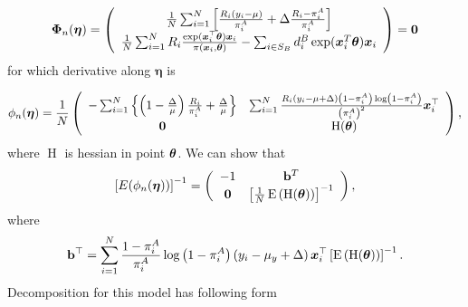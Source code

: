 \documentclass[
  letterpaper,
  DIV=11,
  numbers=noendperiod]{scrreprt}
\begin{document}
\[
\begin{equation*}
\boldsymbol{\Phi}_n(\boldsymbol{\eta})=\left(\begin{array}{c}
\frac{1}{N} \sum_{i=1}^N\left[\frac{R_i\left(y_i-\mu\right)}{\pi_i^A}+\Delta \frac{R_i-\pi_i^A}{\pi_i^A}\right] \\
\frac{1}{N}\sum_{i=1}^N R_i \frac{\exp(\bx_{i}^{\top}\btheta)\bx_{i}}{\pi(\bx_{i}, \btheta)} - \sum_{i \in S_{B}}d_{i}^{B}\exp(\bx_{i}^{T}\btheta)\bx_{i}
\end{array}\right) = \bZero
\end{equation*}
\] for which derivative along \(\boldsymbol{\eta}\) is

\[
\begin{equation*}
\phi_n(\boldsymbol{\eta})=\frac{1}{N}\left(\begin{array}{cc}
-\sum_{i=1}^N\left\{\left(1-\frac{\Delta}{\mu}\right) \frac{R_i}{\pi_i^A}+\frac{\Delta}{\mu}\right\} & \sum_{i=1}^N \frac{R_i\left(y_i-\mu + \Delta\right)\left(1 - \pi_i^A\right)\log \left(1 - \pi_i^A\right)}{\left(\pi_i^A\right)^2} \boldsymbol{x}_i^{\top} \\
\mathbf{0} & \operatorname{H}(\btheta)
\end{array}\right),
\end{equation*}
\] where \(\operatorname{H}\) is hessian in point \(\boldsymbol{\theta}\). We can
show that \[
\begin{equation*}
\left[E(\phi_n(\boldsymbol{\eta}))\right]^{-1}=\left(\begin{array}{cc}
-1 & \mathbf{b}^T \\
\mathbf{0} & \left[\frac{1}{N}\operatorname{E}\left(\operatorname{H}(\btheta)\right)\right]^{-1}
\end{array}\right),
\end{equation*}
\] where \[
\mathbf{b}^{\top} = \sum_{i=1}^N \frac{1-\pi_i^A}{\pi_i^A} \log \left(1 - \pi_i^A\right) \left(y_i - \mu_y + \Delta\right) \boldsymbol{x}_i^{\top}\left[\operatorname{E}\left(\operatorname{H} (\boldsymbol{\theta})\right)\right]^{-1}.
\] Decomposition for this model has following form
\end{document}
